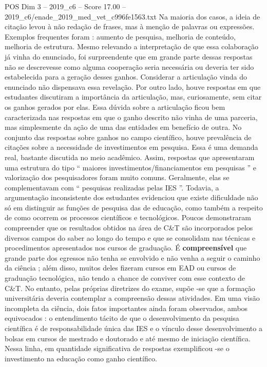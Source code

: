\begin{textsample}{POS Dim 3 – 2019\_c6 – Score 17.00 – 2019\_c6/enade\_2019\_med\_vet\_c996fe1563.txt}
Na maioria dos casos, a ideia de citação levou à não redação de frases, mas à menção de palavras ou expressões.
Exemplos frequentes foram : aumento de pesquisa, melhoria de conteúdo, melhoria de estrutura.
Mesmo relevando a interpretação de que essa colaboração já vinha do enunciado, foi surpreendente que em grande parte dessas respostas não se descrevesse como alguma cooperação seria necessária ou deveria ter sido estabelecida para a geração desses ganhos.
Considerar a articulação vinda do enunciado não dispensava essa revelação.
Por outro lado, houve respostas em que estudantes discutiram a importância da articulação, mas, curiosamente, sem citar os ganhos gerados por elas.
Essa dúvida sobre a articulação ficou bem caracterizada nas respostas em que o ganho descrito não vinha de uma parceria, mas simplesmente da ação de uma das entidades em benefício de outra.
No conjunto das respostas sobre ganhos no campo científico, houve prevalência de citações sobre a necessidade de investimentos em pesquisa.
Essa é uma demanda real, bastante discutida no meio acadêmico.
Assim, respostas que apresentaram uma estrutura do tipo “ maiores investimentos/financiamentos em pesquisas ” e valorização dos pesquisadores foram muito comuns.
Geralmente, elas se complementavam com “ pesquisas realizadas pelas IES ”.
Todavia, a argumentação inconsistente dos estudantes evidenciou que existe dificuldade não só em distinguir as funções de pesquisa das de educação, como também a respeito de como ocorrem os processos científicos e tecnológicos.
Poucos demonstraram compreender que os resultados obtidos na área de C\&T são incorporados pelos diversos campos do saber ao longo do tempo e que se consolidam nas técnicas e procedimentos apresentados nos cursos de graduação.
É \textbf{compreensível} que grande parte dos egressos não tenha se envolvido e não venha a seguir o caminho da ciência ; além disso, muitos deles fizeram cursos em EAD ou cursos de graduação tecnológica, não tendo a chance de conviver com esse contexto de C\&T.
No entanto, pelas próprias diretrizes do exame, supõe -se que a formação universitária deveria contemplar a compreensão dessas atividades.
Em uma visão incompleta da ciência, dois fatos importantes ainda foram observados, ambos equivocados : o entendimento tácito de que o desenvolvimento da pesquisa científica é de responsabilidade única das IES e o vínculo desse desenvolvimento a bolsas em cursos de mestrado e doutorado e até mesmo de iniciação científica.
Nessa linha, em quantidade significativa de respostas exemplificou -se o investimento na educação como ganho científico.

\end{textsample}
